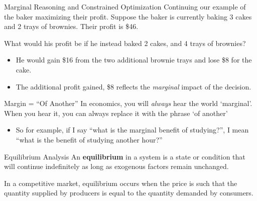 \documentclass[12pt,t]{beamer}
\begin{document}
\begin{frame}{Marginal Reasoning and Constrained Optimization}
  Continuing our example of the baker maximizing their profit. Suppose the baker is currently baking 3 cakes and 2 trays of brownies. Their profit is \$46.

  \bigskip
  What would his profit be if he instead baked 2 cakes, and 4 trays of brownies? 

  \begin{itemize}
    \item He would gain \$16 from the two additional brownie trays and lose \$8 for the cake.
    \item The additional profit gained, \$8 reflects the \textit{marginal} impact of the decision.
  \end{itemize}
\end{frame}

\begin{frame}{Margin = ``Of Another''}
  In economics, you will \emph{always} hear the world `marginal'. When you hear it, you can always replace it with the phrase `of another'

  \begin{itemize}
    \item So for example, if I say ``what is the marginal benefit of studying?'', I mean ``what is the benefit of studying another hour?''
  \end{itemize}
\end{frame}

\begin{frame}{Equilibrium Analysis}
  An \textbf{equilibrium} in a system is a state or condition that will continue indefinitely as long as exogenous factors remain unchanged.

  \bigskip
  In a competitive market, equilibrium occurs when the price is such that the quantity supplied by producers is equal to the quantity demanded by consumers.
\end{frame}
\end{document}
